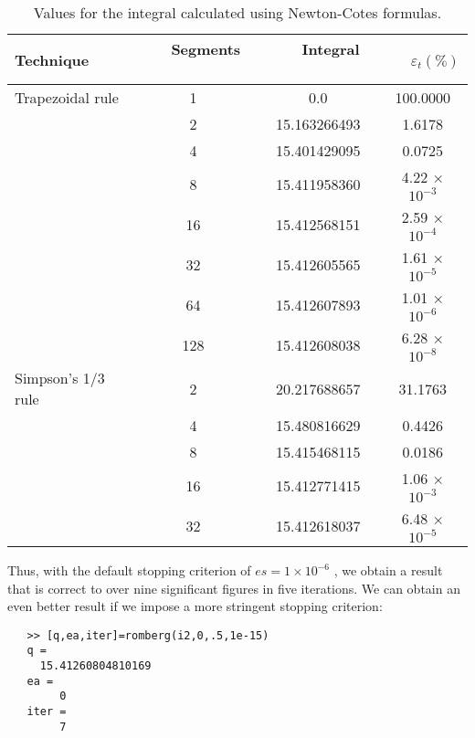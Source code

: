 \documentclass[../main.tex]{subfiles}
\begin{document}
\begin{table}[hbt!]
\caption{\textsf{Values for the integral calculated using Newton-Cotes
formulas. }}
\centering
\begin{tabular}{lccc}
	\hline
	\textbf{Technique} \ \ \ & \ \ \ \textbf{Segments} \ \ \  & \ \ \  \textbf{Integral} \ \ \  & \ \ \  \textbf{$\varepsilon_{t}(\%)$}\\ \hline
	
	Trapezoidal rule & 1 & 0.0 & 100.0000\\
	
	\vspace{0in} & 2 & 15.163266493 & 1.6178\\
	
	\vspace{0in} & 4 & 15.401429095 & 0.0725\\
	
	\vspace{0in} & 8 & 15.411958360 &  4.22 × $10^{-3}$\\
	
	\vspace{0in} & 16 & 15.412568151 & 2.59 × $10^{-4}$\\
	
	\vspace{0in} & 32 &  15.412605565 & 1.61 × $10^{-5}$\\
	
	\vspace{0in} & 64 &  15.412607893 &  1.01 × $10^{-6}$\\
	
	\vspace{0in} & 128 & 15.412608038 & 6.28 × $10^{-8}$\\ \hline
	
	Simpson's 1/3 rule & 2 & 20.217688657 & 31.1763\\
	
	\vspace{0in} & 4 & 15.480816629 &  0.4426\\
	
	\vspace{0in} & 8 & 15.415468115 & 0.0186\\
	
	\vspace{0in} & 16 & 15.412771415 & 1.06 × $10^{-3}$\\
	
	\vspace{0in} & 32 & 15.412618037 & 6.48 × $10^{-5}$\\ \hline
\end{tabular}
\end{table}
Thus, with the default stopping criterion of $es = 1 × 10^{−6}$
, we obtain a result that is correct
to over nine significant figures in five iterations. We can obtain an even better result if we
impose a more stringent stopping criterion:
\begin{verbatim}
   >> [q,ea,iter]=romberg(i2,0,.5,1e-15)
   q =
     15.41260804810169
   ea =
        0
   iter =
        7
\end{verbatim}
\end{document}
